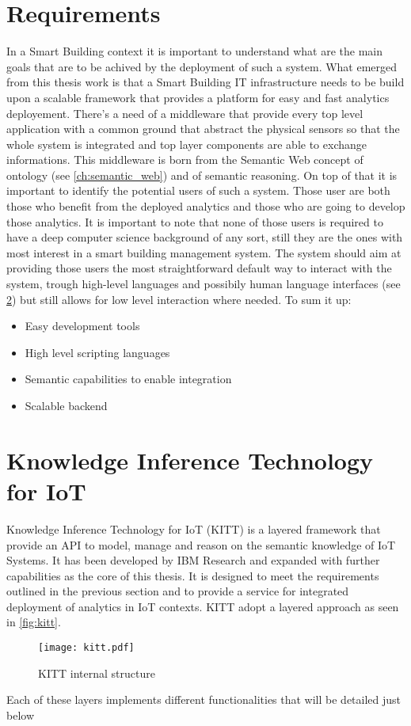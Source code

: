 \section{Requirements}
In a Smart Building context it is important to understand what are the main goals that are to be achived by the deployment of such a system. What emerged from this thesis work is that a Smart Building IT infrastructure needs to be build upon a scalable framework that provides a platform for easy and fast analytics deployement. There's a need of a middleware that provide every top level application with a common ground that abstract the physical sensors so that the whole system is integrated and top layer components are able to exchange informations. %
This middleware is born from the Semantic Web concept of ontology (see \autoref{ch:semantic_web}) and of semantic reasoning.
On top of that it is important to identify the potential users of such a system. Those user are both those who benefit from the deployed analytics and those who are going to develop those analytics. It is important to note that none of those users is required to have a deep computer science background of any sort, still they are the ones with most interest in a smart building management system. The system should aim at providing those users the most straightforward default way to interact with the system, trough high-level languages and possibily human language interfaces (see \ref{}) but still allows for low level interaction where needed. To sum it up:
\begin{itemize}
  \item Easy development tools
  \item High level scripting languages
  \item Semantic capabilities to enable integration
  \item Scalable backend
\end{itemize}

\section{Knowledge Inference Technology for IoT}
Knowledge Inference Technology for IoT (KITT) is a layered framework that provide an API to model, manage and reason on the semantic knowledge of IoT Systems. It has been developed by IBM Research and expanded with further capabilities as the core of this thesis. It is designed to meet the requirements outlined in the previous section and to provide a service for integrated deployment of analytics in IoT contexts.
KITT adopt a layered approach as seen in \autoref{fig:kitt}.
\begin{figure}
  \texttt{[image: kitt.pdf]}
  \caption{KITT internal structure}
  \label{fig:kitt}
\end{figure}
Each of these layers implements different functionalities that will be detailed just below

